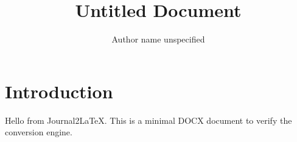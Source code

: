 \documentclass[10pt]{NSP1}
\begin{document}

\title{Untitled Document}

\author{Author name unspecified}
\institute{}

\abstracttext{}

\keywords{}

\maketitle

\section{Introduction}

Hello from Journal2LaTeX. This is a minimal DOCX document to verify the conversion engine.
\end{document}
